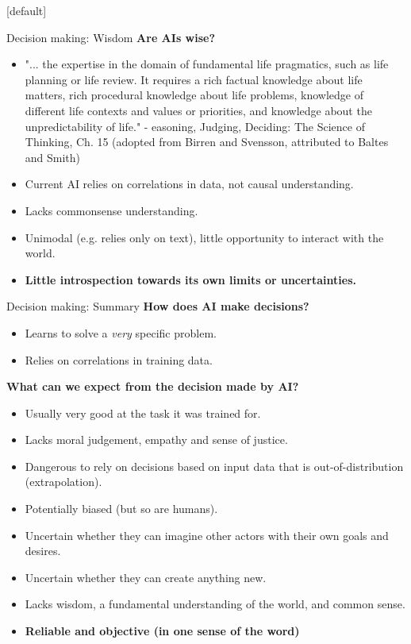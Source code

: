 \documentclass[8pt]{beamer}
\begin{document}
	[default]

	\begin{frame}{Decision making: Wisdom}
		\textbf{Are AIs wise?}
		\begin{itemize}
			\item "... the expertise in the domain of fundamental life pragmatics, such as life planning or life review. It requires a rich factual knowledge about life matters, rich procedural knowledge about life problems, knowledge of different life contexts and values or priorities, and knowledge about the unpredictability of life." - easoning, Judging, Deciding: The Science of Thinking, Ch. 15 (adopted from Birren and Svensson, attributed to Baltes and Smith)
			\item Current AI relies on correlations in data, not causal understanding.
			\item Lacks commonsense understanding.
			\item Unimodal (e.g. relies only on text), little opportunity to interact with the world.
			\item \textbf{Little introspection towards its own limits or uncertainties.}
		\end{itemize}
	\end{frame}

	\begin{frame}{Decision making: Summary}
		\textbf{How does AI make decisions?}
		\begin{itemize}
			\item Learns to solve a \textit{very} specific problem.
			\item Relies on correlations in training data.
		\end{itemize}
		\textbf{What can we expect from the decision made by AI?}
		\begin{itemize}
			\item Usually very good at the task it was trained for.
			\item Lacks moral judgement, empathy and sense of justice.
			\item Dangerous to rely on decisions based on input data that is out-of-distribution (extrapolation).
			\item Potentially biased (but so are humans).
			\item Uncertain whether they can imagine other actors with their own goals and desires.
			\item Uncertain whether they can create anything new.
			\item Lacks wisdom, a fundamental understanding of the world, and common sense.
			\item \textbf{Reliable and objective (in one sense of the word)}
		\end{itemize}
	\end{frame}
\end{document}
